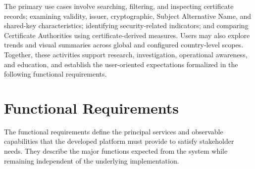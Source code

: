 The primary use cases involve searching, filtering, and inspecting certificate
records; examining validity, issuer, cryptographic, Subject Alternative Name,
and shared-key characteristics; identifying security-related indicators; and
comparing Certificate Authorities using certificate-derived measures. Users
may also explore trends and visual summaries across global and configured
country-level scopes. Together, these activities support research,
investigation, operational awareness, and education, and establish the
user-oriented expectations formalized in the following functional
requirements.

\clearpage
\section{Functional Requirements}
\label{sec:derived-functional-requirements}

The functional requirements define the principal services and observable 
capabilities that the developed platform must provide to satisfy stakeholder 
needs. They describe the major functions expected from the system while 
remaining independent of the underlying implementation.

